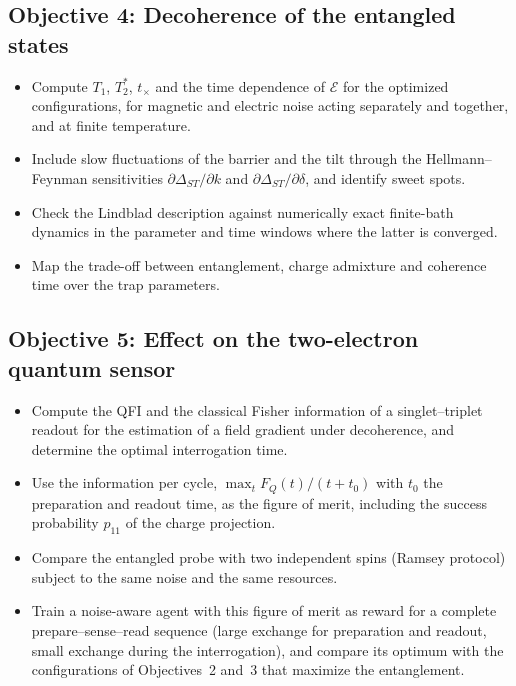 \documentclass[12pt,a4paper]{article}
\begin{document}
\subsection*{Objective 4: Decoherence of the entangled states}
\begin{itemize}
  \item Compute $T_1$, $T_2^*$, $t_\times$ and the time dependence of
  $\mathcal E$ for the optimized configurations, for magnetic and
  electric noise acting separately and together, and at finite
  temperature.
  \item Include slow fluctuations of the barrier and the tilt through
  the Hellmann--Feynman sensitivities
  $\partial\Delta_{ST}/\partial k$ and
  $\partial\Delta_{ST}/\partial\delta$, and identify sweet spots.
  \item Check the Lindblad description against numerically exact
  finite-bath dynamics in the parameter and time windows where the
  latter is converged.
  \item Map the trade-off between entanglement, charge admixture and
  coherence time over the trap parameters.
\end{itemize}

\subsection*{Objective 5: Effect on the two-electron quantum sensor}
\begin{itemize}
  \item Compute the QFI and the classical Fisher information of a
  singlet--triplet readout for the estimation of a field gradient
  under decoherence, and determine the optimal interrogation time.
  \item Use the information per cycle,
  $\max_t F_Q(t)/(t+t_0)$ with $t_0$ the preparation and readout time,
  as the figure of merit, including the success probability $p_{11}$
  of the charge projection.
  \item Compare the entangled probe with two independent spins
  (Ramsey protocol) subject to the same noise and the same resources.
  \item Train a noise-aware agent with this figure of merit as reward
  for a complete prepare--sense--read sequence (large exchange for
  preparation and readout, small exchange during the interrogation),
  and compare its optimum with the configurations of Objectives~2
  and~3 that maximize the entanglement.
\end{itemize}
\end{document}
